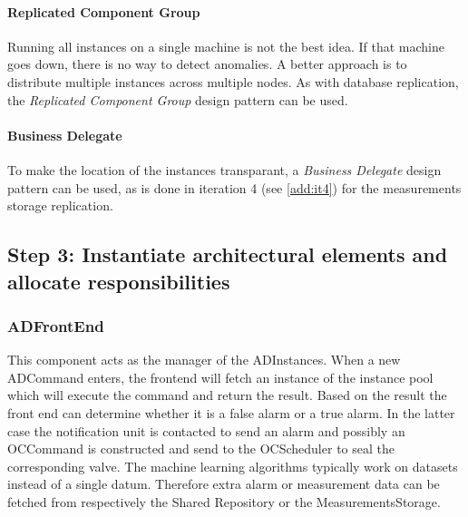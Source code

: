 \paragraph{Replicated Component Group}

\npar Running all instances on a single machine is not the best idea. If that
machine goes down, there is no way to detect anomalies. A better approach is to
distribute multiple instances across multiple nodes. As with database
replication, the  \emph{Replicated Component Group} design pattern
\citep[see][p.~326]{Buschmann:07} can be used.

\paragraph{Business Delegate}

\npar To make the location of the instances transparant, a \emph{Business
Delegate} design pattern \citep[see][p.~292]{Buschmann:07} can be used, as is
done in iteration 4 (see \ref{add:it4}) for the measurements storage replication.

\subsection{Step 3: Instantiate architectural elements and allocate responsibilities}
\label{add:it6/elements}

\subsubsection{ADFrontEnd}

\npar This component acts as the manager of the ADInstances. When a new
ADCommand enters, the frontend will fetch an instance of the instance pool
which will execute the command and return the result. Based on the result the front
end can determine whether it is a false alarm or a true alarm. In the latter
case the notification unit is contacted to send an alarm and possibly an
OCCommand is constructed and send to the OCScheduler to seal the corresponding
valve. The machine learning algorithms typically work on datasets instead of a
single datum. Therefore extra alarm or measurement data can be fetched from
respectively the Shared Repository or the MeasurementsStorage.

